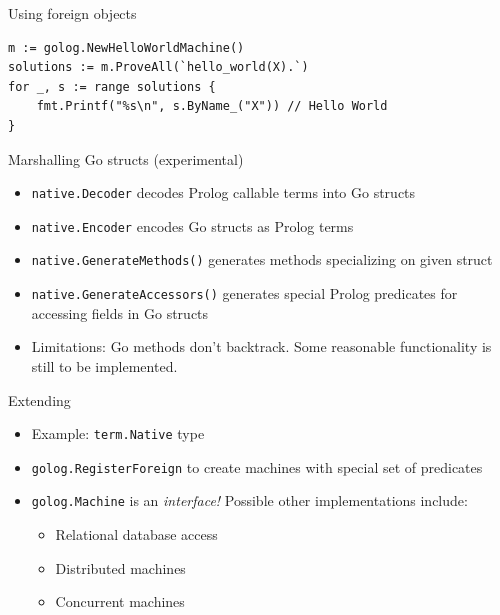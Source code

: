 \documentclass[presentation]{beamer}
\begin{document}
\begin{frame}[fragile,label=sec-3-7]{Using foreign objects}
 \begin{verbatim}
m := golog.NewHelloWorldMachine()
solutions := m.ProveAll(`hello_world(X).`)
for _, s := range solutions {
    fmt.Printf("%s\n", s.ByName_("X")) // Hello World
}
\end{verbatim}
\end{frame}

\begin{frame}[fragile,label=sec-3-8]{Marshalling Go structs (experimental)}
 \begin{itemize}
\item \texttt{native.Decoder} decodes Prolog callable terms into Go structs
\item \texttt{native.Encoder} encodes Go structs as Prolog terms
\item \texttt{native.GenerateMethods()} generates methods specializing on
given struct
\item \texttt{native.GenerateAccessors()} generates special Prolog predicates
for accessing fields in Go structs
\item \alert{Limitations:} Go methods don't backtrack.  Some reasonable
functionality is still to be implemented.
\end{itemize}
\end{frame}

\begin{frame}[fragile,label=sec-3-9]{Extending}
 \begin{itemize}
\item Example: \texttt{term.Native} type
\item \texttt{golog.RegisterForeign} to create machines with special set of
predicates
\item \texttt{golog.Machine} is an \emph{interface!} Possible other implementations
include:
\begin{itemize}
\item Relational database access
\item Distributed machines
\item Concurrent machines
\end{itemize}
\end{itemize}
\end{frame}
\end{document}
